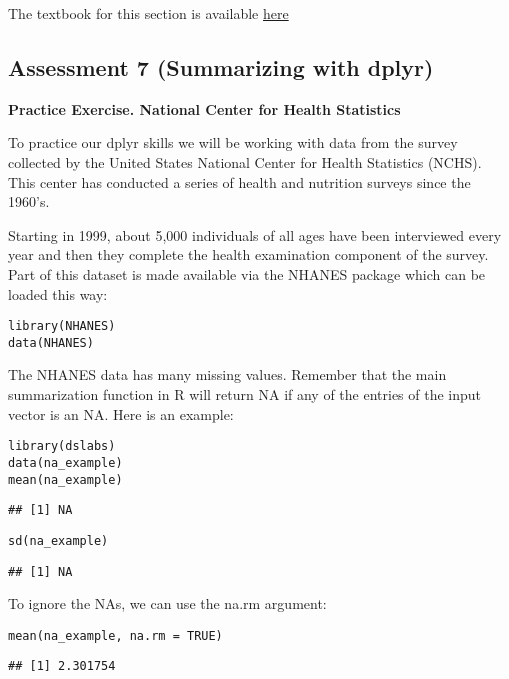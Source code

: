\documentclass[]{article}
\begin{document}
The textbook for this section is available
\href{https://rafalab.github.io/dsbook/tidyverse.html\#tidy-data}{here}

\hypertarget{assessment-7-summarizing-with-dplyr}{%
\subsection{Assessment 7 (Summarizing with
dplyr)}\label{assessment-7-summarizing-with-dplyr}}

\textbf{Practice Exercise. National Center for Health Statistics}

To practice our dplyr skills we will be working with data from the
survey collected by the United States National Center for Health
Statistics (NCHS). This center has conducted a series of health and
nutrition surveys since the 1960's.

Starting in 1999, about 5,000 individuals of all ages have been
interviewed every year and then they complete the health examination
component of the survey. Part of this dataset is made available via the
NHANES package which can be loaded this way:

\begin{verbatim}
library(NHANES)
data(NHANES)
\end{verbatim}

The NHANES data has many missing values. Remember that the main
summarization function in R will return NA if any of the entries of the
input vector is an NA. Here is an example:

\begin{verbatim}
library(dslabs)
data(na_example)
mean(na_example)
\end{verbatim}

\begin{verbatim}
## [1] NA
\end{verbatim}

\begin{verbatim}
sd(na_example)
\end{verbatim}

\begin{verbatim}
## [1] NA
\end{verbatim}

To ignore the NAs, we can use the na.rm argument:

\begin{verbatim}
mean(na_example, na.rm = TRUE)
\end{verbatim}

\begin{verbatim}
## [1] 2.301754
\end{verbatim}
\end{document}
